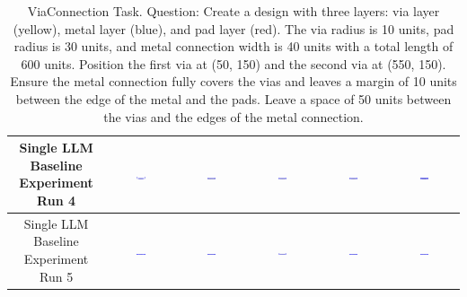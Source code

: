 \begin{table}[H]
\begin{tabular}{|c|c|c|c|c|c|}
    \hline
    Single LLM Baseline Experiment Run 4 & \includegraphics[width=0.15\textwidth]{./run_4/png/gpt-4o_results/ViaConnection.png} & \includegraphics[width=0.15\textwidth]{./run_4/png/claude-3-5-sonnet-20240620_results/ViaConnection.png} & \includegraphics[width=0.15\textwidth]{./run_4/png/watsonx_meta-llama_llama-3-1-70b-instruct_results/ViaConnection.png} & \includegraphics[width=0.15\textwidth]{./run_4/png/watsonx_meta-llama_llama-3-405b-instruct_results/ViaConnection.png} & \includegraphics[width=0.15\textwidth]{./run_4/png/o1-preview_results/ViaConnection.png} \\
    \hline
    Single LLM Baseline Experiment Run 5 & \includegraphics[width=0.15\textwidth]{./run_5/png/gpt-4o_results/ViaConnection.png} & \includegraphics[width=0.15\textwidth]{./run_5/png/claude-3-5-sonnet-20240620_results/ViaConnection.png} & \includegraphics[width=0.15\textwidth]{./run_5/png/watsonx_meta-llama_llama-3-1-70b-instruct_results/ViaConnection.png} & \includegraphics[width=0.15\textwidth]{./run_5/png/watsonx_meta-llama_llama-3-405b-instruct_results/ViaConnection.png} & \includegraphics[width=0.15\textwidth]{./run_5/png/o1-preview_results/ViaConnection.png} \\
    \hline
    \end{tabular}
    \caption{ViaConnection Task. Question: Create a design with three layers: via layer (yellow), metal layer (blue), and pad layer (red). The via radius is 10 units, pad radius is 30 units, and metal connection width is 40 units with a total length of 600 units. Position the first via at (50, 150) and the second via at (550, 150). Ensure the metal connection fully covers the vias and leaves a margin of 10 units between the edge of the metal and the pads. Leave a space of 50 units between the vias and the edges of the metal connection.}
\end{table}

